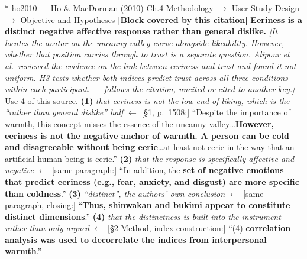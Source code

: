 \documentclass[11pt, a4paper]{article}
\makeatletter
\newcounter{citentry}
\newcommand{\citentry@core}[7]{%
  \stepcounter{citentry}
  \begingroup
  \sbox{\citentry@measurebox}{%
    \begin{minipage}{\linewidth}
      \noindent\colorbox{konstanzblue}{\parbox{\dimexpr\linewidth-2\fboxsep}{%
        \vspace{3pt}
        \textbf{\#\thecitentry \quad #2} \hfill \textit{#3}
        \vspace{3pt}
      }}
      \vspace{3pt}
      \noindent\begin{tabular}{@{}p{2.7cm} p{\dimexpr\linewidth-3cm}@{}}
        \textit{\small Sentence in thesis:} & #4 \\[5pt]
        \textbf{Usage:}\hfill       & #5 \\[5pt]
        \textit{\small Original source:}     & #6 \\[5pt]
        \textbf{How to check:}             & #7 \\
      \end{tabular}
      \vspace{5pt}
      \rule{10pt}{10pt}\quad \textbf{Validated} --- I have read the original and agree it supports the sentence.
    \end{minipage}%
  }%
  \Needspace{\dimexpr\ht\citentry@measurebox+\dp\citentry@measurebox\relax}%
  \endgroup
  \vspace{10pt}
  \noindent\colorbox{konstanzblue}{\parbox{\dimexpr\linewidth-2\fboxsep}{%
    \vspace{3pt}
    \textcolor{white}{\textbf{\#\thecitentry \quad #2}} \hfill \textcolor{white}{\textit{#3}}
    \vspace{3pt}
  }}
  \vspace{3pt}
  \noindent\begin{tabular}{@{}p{2.7cm} p{\dimexpr\linewidth-3cm}@{}}
    \textit{\small Sentence in thesis:} & \textcolor{darkgreen}{#4} \\[5pt]
    \textbf{Usage:}\hfill       & #5 \\[5pt]
    \textit{\small Original source:}     & \textcolor{darkred}{#6} \\[5pt]
    \textbf{How to check:}             & #7 \\
  \end{tabular}
  \vspace{5pt}
  \noindent\CheckBox[name=verified\thecitentry, width=10pt, height=10pt, bordercolor={0 0 0}, borderwidth=0.75, backgroundcolor={1 1 1}#1]{}\quad \textbf{Validated} --- I have read the original and agree it supports the sentence.
  \vspace{3pt}
  \noindent\textcolor{midgray}{\rule{\linewidth}{0.4pt}}
}
\newcommand{\citentry}{\@ifstar{\citentry@core{, checked}}{\citentry@core{}}}
\makeatother
\begin{document}
\begin{Form}
\citentry*
  {ho2010 --- Ho \& MacDorman (2010)}
  {Ch.4 Methodology $\rightarrow$ User Study Design $\rightarrow$ Objective and Hypotheses}
  {\textbf{[Block covered by this citation]} \textbf{Eeriness is a distinct negative affective response rather than general dislike.} \emph{[It locates the avatar on the uncanny valley curve alongside likeability. However, whether that position carries through to trust is a separate question. Alipour et al.\ reviewed the evidence on the link between eeriness and trust and found it not uniform. H3 tests whether both indices predict trust across all three conditions within each participant. --- follows the citation, uncited or cited to another key.]}}
  {Use 4 of this source.}
  {\textbf{(1)} \emph{that eeriness is not the low end of liking, which is the ``rather than general dislike'' half} $\leftarrow$ [\S1, p.~1508:] ``Despite the importance of warmth, this concept misses the essence of the uncanny valley\ldots \textbf{However, eeriness is not the negative anchor of warmth. A person can be cold and disagreeable without being eerie}\ldots at least not eerie in the way that an artificial human being is eerie.'' \quad \textbf{(2)} \emph{that the response is specifically affective and negative} $\leftarrow$ [same paragraph:] ``In addition, the \textbf{set of negative emotions that predict eeriness (e.g., fear, anxiety, and disgust) are more specific than coldness}.'' \quad \textbf{(3)} \emph{``distinct'', the authors' own conclusion} $\leftarrow$ [same paragraph, closing:] ``\textbf{Thus, shinwakan and bukimi appear to constitute distinct dimensions}.'' \quad \textbf{(4)} \emph{that the distinctness is built into the instrument rather than only argued} $\leftarrow$ [\S2 Method, index construction:] ``(4) \textbf{correlation analysis was used to decorrelate the indices from interpersonal warmth}.''}

\end{Form}
\end{document}
